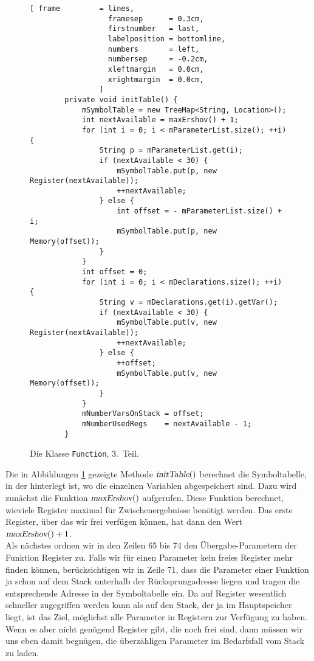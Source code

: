 \begin{figure}[!ht]
\centering
\begin{Verbatim}[ frame         = lines, 
                  framesep      = 0.3cm, 
                  firstnumber   = last,
                  labelposition = bottomline,
                  numbers       = left,
                  numbersep     = -0.2cm,
                  xleftmargin   = 0.0cm,
                  xrightmargin  = 0.0cm,
                ]
        private void initTable() {
            mSymbolTable = new TreeMap<String, Location>();
            int nextAvailable = maxErshov() + 1;
            for (int i = 0; i < mParameterList.size(); ++i) {
                String p = mParameterList.get(i);
                if (nextAvailable < 30) {
                    mSymbolTable.put(p, new Register(nextAvailable));
                    ++nextAvailable;
                } else {
                    int offset = - mParameterList.size() + i;
                    mSymbolTable.put(p, new Memory(offset));
                }
            }
            int offset = 0;    
            for (int i = 0; i < mDeclarations.size(); ++i) {
                String v = mDeclarations.get(i).getVar();
                if (nextAvailable < 30) {
                    mSymbolTable.put(v, new Register(nextAvailable));
                    ++nextAvailable;
                } else {
                    ++offset;
                    mSymbolTable.put(v, new Memory(offset));
                }
            }
            mNumberVarsOnStack = offset;
            mNumberUsedRegs    = nextAvailable - 1;
        }
\end{Verbatim}
\vspace*{-0.3cm}
\caption{Die Klasse \texttt{Function}, 3.~Teil.}
\label{fig:Function.java-SRP-3}
\end{figure}


Die in Abbildungen \ref{fig:Function.java-SRP-3} gezeigte Methode $\textsl{initTable}()$
berechnet die Symboltabelle, in der hinterlegt ist, wo die einzelnen Variablen
abgespeichert sind.  Dazu wird zun\"achst die Funktion $\textsl{maxErshov}()$ aufgerufen.
Diese Funktion berechnet, wieviele Register maximal f\"ur Zwischenergebnisse ben\"otigt
werden.  Das erste Register, \"uber das wir frei verf\"ugen k\"onnen, hat dann den Wert
\\[0.2cm]
\hspace*{1.3cm}
$\textsl{maxErshov}() + 1$.
\\[0.2cm]
Als n\"achstes ordnen wir in den Zeilen 65 bis 74 den \"Ubergabe-Parametern der Funktion
Register zu.  Falls wir f\"ur einen Parameter kein freies Register mehr finden k\"onnen,
ber\"ucksichtigen wir in Zeile 71, dass die Parameter einer Funktion ja schon auf dem Stack
unterhalb der R\"ucksprungadresse liegen und tragen die entsprechende Adresse in der
Symboltabelle ein.  Da auf Register wesentlich schneller zugegriffen werden kann als auf
den Stack, der ja im Hauptspeicher liegt, ist das
Ziel, m\"oglichst alle Parameter in Registern zur Verf\"ugung zu haben.  Wenn es aber nicht
gen\"ugend  Register gibt, die noch frei sind, dann m\"ussen wir uns eben damit begn\"ugen, die
\"uberz\"ahligen Parameter im Bedarfsfall vom Stack zu laden.


